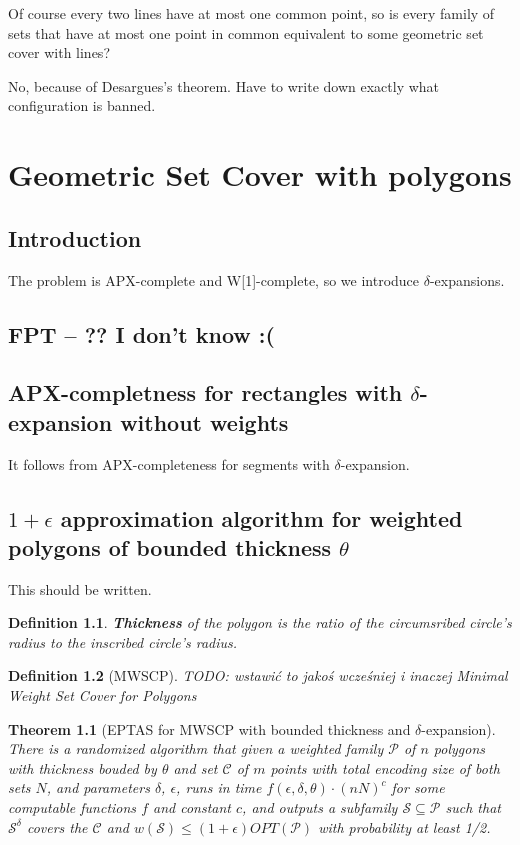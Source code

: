 \documentclass[en]{pracamgr}
\newtheorem{defi}{Definition}[section]
\newtheorem{tw}{Theorem}[section]
\begin{document}
Of course every two lines have at most one common point,
so is every family of sets that have at most one point
in common equivalent to some geometric set cover with lines?

No, because of Desargues's theorem.
Have to write down exactly what configuration is banned.


\chapter{Geometric Set Cover with polygons}
\section{Introduction}
The problem is APX-complete and W[1]-complete,
so we introduce $\delta$-expansions.

\section{FPT -- ?? I don't know :(}

\section{APX-completness for rectangles with $\delta$-expansion without weights}
It follows from APX-completeness for segments with $\delta$-expansion.
\section{$1+\epsilon$ approximation algorithm for weighted polygons of bounded thickness $\theta$}
This should be written.

\begin{defi}
  \textbf{Thickness} of the polygon
  is the ratio of the circumsribed circle's
  radius to the inscribed circle's radius.
\end{defi}

\begin{defi}[MWSCP]
	TODO: wstawić to jakoś wcześniej i inaczej
	Minimal Weight Set Cover for Polygons
\end{defi}

\begin{tw}[EPTAS for MWSCP with bounded thickness and $\delta$-expansion]
There is a randomized algorithm that given
a weighted family $\mathcal{P}$ of $n$ polygons
with thickness bouded by $\theta$
and set $\mathcal{C}$ of $m$ points
with total encoding
size of both sets $N$, and parameters $\delta$, $\epsilon$,
runs in time $f(\epsilon, \delta, \theta) \cdot (nN)^c$
for some computable functions $f$ and constant $c$,
and outputs a subfamily $\mathcal{S} \subseteq \mathcal{P}$
such that $\mathcal{S}^{\delta}$
covers the $\mathcal{C}$
and $w(\mathcal{S}) \le (1+\epsilon)OPT(\mathcal{P})$
with probability at least 1/2.
\end{tw}
\end{document}
